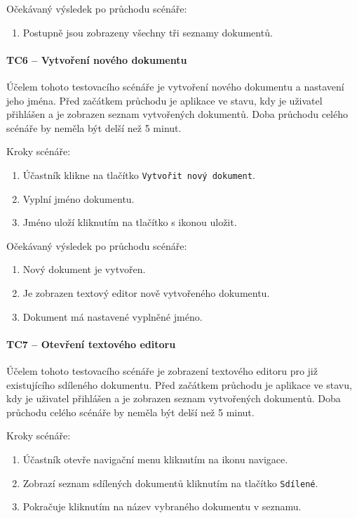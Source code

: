 Očekávaný výsledek po průchodu scénáře:
\begin{enumerate}
    \item Postupně jsou zobrazeny všechny tři seznamy dokumentů.
\end{enumerate}


\paragraph{TC6 -- Vytvoření nového dokumentu}

Účelem tohoto testovacího scénáře je vytvoření nového dokumentu a nastavení jeho jména.
Před začátkem průchodu je aplikace ve stavu, kdy je uživatel přihlášen a je zobrazen seznam vytvořených dokumentů.
Doba průchodu celého scénáře by neměla být delší než 5 minut.

\pagebreak

Kroky scénáře:
\begin{enumerate}
    \item Účastník klikne na tlačítko \texttt{Vytvořit nový dokument}.
    \item Vyplní jméno dokumentu.
    \item Jméno uloží kliknutím na tlačítko s ikonou uložit.
\end{enumerate}

Očekávaný výsledek po průchodu scénáře:
\begin{enumerate}
    \item Nový dokument je vytvořen.
    \item Je zobrazen textový editor nově vytvořeného dokumentu.
    \item Dokument má nastavené vyplněné jméno.
\end{enumerate}

\paragraph{TC7 -- Otevření textového editoru}

Účelem tohoto testovacího scénáře je zobrazení textového editoru pro již existujícího sdíleného dokumentu.
Před začátkem průchodu je aplikace ve stavu, kdy je uživatel přihlášen a je zobrazen seznam vytvořených dokumentů.
Doba průchodu celého scénáře by neměla být delší než 5 minut.

Kroky scénáře:
\begin{enumerate}
    \item Účastník otevře navigační menu kliknutím na ikonu navigace.
    \item Zobrazí seznam sdílených dokumentů kliknutím na tlačítko \texttt{Sdílené}.
    \item Pokračuje kliknutím na název vybraného dokumentu v seznamu.
\end{enumerate}

